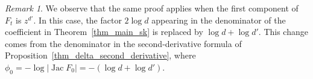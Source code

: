 \documentclass[11pt]{amsart}
\theoremstyle{plain}
\theoremstyle{definition}
\theoremstyle{remark}
\newtheorem{rmk}[thm]{Remark}
\DeclareMathOperator{\Jac}{Jac}
\begin{document}
\begin{rmk}
We observe that the same proof applies when the first component of $F_t$
is $z^{d'}$.
In this case, the factor $2\log d$ appearing in the denominator of the
coefficient in Theorem~\ref{thm_main_sk} is replaced by $\log d+\log d'$.
This change comes from the denominator in the second-derivative formula
of Proposition~\ref{thm_delta_second_derivative}, where
$\phi_0=-\log|\Jac F_0|=-(\log d+\log d')$.
\end{rmk}





\printbibliography
\end{document}
